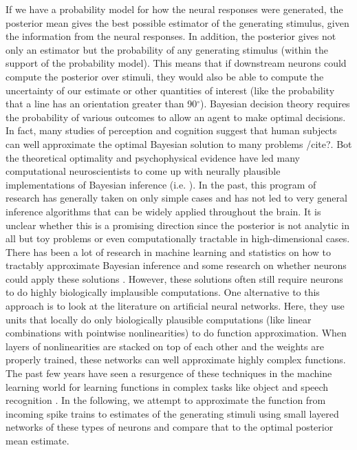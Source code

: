 \documentclass{article} %
\begin{document}
If we have a probability model for how the neural responses were generated, the posterior mean gives the best possible estimator of the generating stimulus, given the information from the neural responses. In addition, the posterior gives not only an estimator but the probability of any generating stimulus (within the support of the probability model). This means that if downstream neurons could compute the posterior over stimuli, they would also be able to compute the uncertainty of our estimate or other quantities of interest (like the probability that a line has an orientation greater than 90$^{\circ}$). Bayesian decision theory requires the probability of various outcomes to allow an agent to make optimal decisions. In fact, many studies of perception and cognition suggest that human subjects can well approximate the optimal Bayesian solution to many problems /cite{?}. Bot the theoretical optimality and psychophysical evidence have led many computational neuroscientists to come up with neurally plausible implementations of Bayesian inference (i.e. \cite{Ma2006}). In the past, this program of research has generally taken on only simple cases and has not led to very general inference algorithms that can be widely applied throughout the brain. It is unclear whether this is a promising direction since the posterior is not analytic in all but toy problems or even computationally tractable in high-dimensional cases. There has been a lot of research in machine learning and statistics on how to tractably approximate Bayesian inference and some research on whether neurons could apply these solutions \cite{?}. However, these solutions often still require neurons to do highly biologically implausible computations. 
One alternative to this approach is to look at the literature on artificial neural networks. Here, they use units that locally do only biologically plausible computations (like linear combinations with pointwise nonlinearities) to do function approximation. When layers of nonlinearities are stacked on top of each other and the weights are properly trained, these networks can well approximate highly complex functions. The past few years have seen a resurgence of these techniques in the machine learning world for learning functions in complex tasks like object and speech recognition \cite{?}. In the following, we attempt to approximate the function from incoming spike trains to estimates of the generating stimuli using small layered networks of these types of neurons and compare that to the optimal posterior mean estimate.
\end{document}
